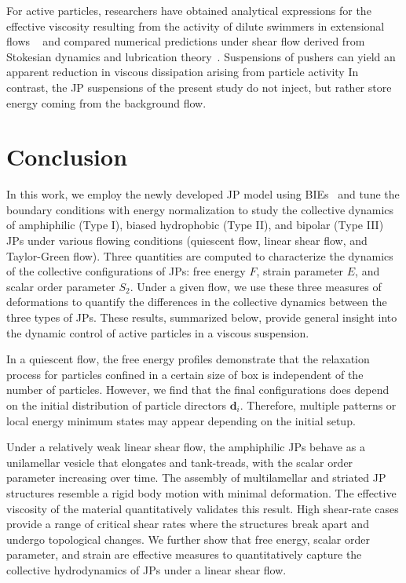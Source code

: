 \documentclass[prb,preprint,showpacs,preprintnumbers,amsmath,amssymb,longbibliography]{revtex4-2}
\newcommand{\dd}{\mathbf{d}}
\begin{document}
For active particles, researchers have 
obtained analytical expressions for the effective viscosity
resulting from the activity of dilute swimmers
in extensional flows
~\cite{Saintillan2010ExtensionalRO} and compared
numerical predictions under shear flow derived from
Stokesian dynamics and lubrication theory~\cite{ishikawa_brumley_pedley_2021}.
Suspensions of pushers can yield an apparent reduction
in viscous dissipation arising from particle activity
In contrast, the JP suspensions of the present study
do not inject, but rather store energy coming from the
background flow.



\section{Conclusion}
\label{sec:conclusion}

In this work, we employ the newly developed JP model using
BIEs~\cite{Fu20, Fu2022_JFM} and tune the boundary conditions with
energy normalization to study the collective dynamics of amphiphilic
(Type I), biased hydrophobic (Type II), and bipolar (Type III) JPs under
various flowing conditions (quiescent flow, linear shear flow, and
Taylor-Green flow). Three quantities are computed to characterize the
dynamics of the collective configurations of JPs: free energy $F$,
strain parameter $E$, and scalar order parameter $S_2$. 
Under a given flow, we use these three measures of deformations to
quantify the differences in the collective dynamics between the three
types of JPs. These results, summarized below, provide general insight
into the dynamic control of active particles in a viscous suspension.

In a quiescent flow, the free energy profiles demonstrate that the
relaxation process for particles confined in a certain size of box is
independent of the number of particles. However, we find that the final
configurations does depend on the initial distribution of particle
directors $\dd_i$. Therefore, multiple patterns or local energy minimum
states may appear depending on the initial setup.

Under a relatively weak linear shear flow, the amphiphilic JPs behave as
a unilamellar vesicle that elongates and tank-treads, with the scalar
order parameter increasing over time. The assembly of multilamellar and
striated JP structures resemble a rigid body motion with minimal
deformation. The effective viscosity of the material quantitatively
validates this result. High shear-rate cases provide a range of critical
shear rates where the structures break apart and undergo topological
changes. We further show that free energy, scalar order parameter, and
strain are effective measures to quantitatively capture the collective
hydrodynamics of JPs under a linear shear flow.
\end{document}
